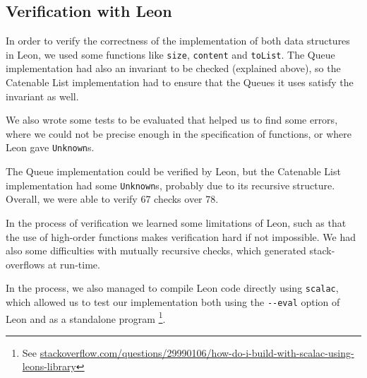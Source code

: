 \subsection{Verification with Leon}
In order to verify the correctness of the implementation of both data structures in Leon,
we used some functions like \verb|size|, \verb|content| and \verb|toList|.
The Queue implementation had also an invariant to be checked (explained above),
so the Catenable List implementation had to ensure that the Queues it uses 
satisfy the invariant as well.

We also wrote some tests to be evaluated that helped us to find some errors,
where we could not be precise enough in the specification of functions,
or where Leon gave \verb|Unknown|s.

The Queue implementation could be verified by Leon,
but the Catenable List implementation had some \verb|Unknown|s,
probably due to its recursive structure. Overall, we were able to verify 67 checks over 78.

In the process of verification we learned some limitations of Leon,
such as that the use of high-order functions makes verification hard if not impossible.
We had also some difficulties with mutually recursive checks, 
which generated stack-overflows at run-time.

In the process, we also managed to compile Leon code directly using \verb|scalac|, 
which allowed us to test our implementation both using the \verb|--eval| option of
Leon and as a standalone program \footnote{See \href{https://stackoverflow.com/questions/29990106/how-do-i-build-with-scalac-using-leons-library}{stackoverflow.com/questions/29990106/how-do-i-build-with-scalac-using-leons-library}}.